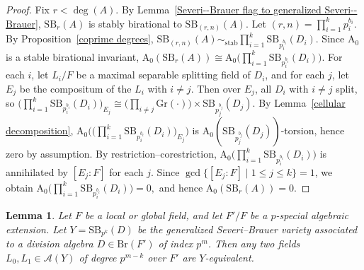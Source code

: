 \documentclass[10pt]{amsart}
\theoremstyle{plain}
\newtheorem{lemma}[thm]{Lemma}
\theoremstyle{definition}
\newcommand{\Br}{\text{Br}}
\begin{document}
\begin{proof}
Fix \(r < \deg(A)\). By Lemma~\ref{Severi--Brauer flag to generalized Severi--Brauer}, \(\mathrm{SB}_r(A)\) is stably birational to \(\mathrm{SB}_{(r,n)}(A)\). Let \((r,n)=\prod_{i=1}^k p_i^{b_i}\). By Proposition~\ref{coprime degrees}, \(\mathrm{SB}_{(r,n)}(A) \sim_{\mathrm{stab}} \prod_{i=1}^k \mathrm{SB}_{p_i^{b_i}}(D_i)\). Since \(\mathrm{A_0}\) is a stable birational invariant, 
\(
\mathrm{A_0}(\mathrm{SB}_r(A)) \cong \mathrm{A_0}\!\big(\prod_{i=1}^k \mathrm{SB}_{p_i^{b_i}}(D_i)\big)\). For each \(i\), let \(L_i/F\) be a maximal separable splitting field of \(D_i\), and for each \(j\), let \(E_j\) be the compositum of the \(L_i\) with \(i\neq j\). Then over \(E_j\), all \(D_i\) with \(i\neq j\) split, so 
\(
\big(\prod_{i=1}^k \mathrm{SB}_{p_i^{b_i}}(D_i)\big)_{E_j}
\cong
\big(\prod_{i\ne j} \mathrm{Gr}(\cdot)\big)\times \mathrm{SB}_{p_j^{b_j}}(D_j).
\)
By Lemma~\ref{cellular decomposition}, 
\(
\mathrm{A_0}\!\big(\big(\prod_{i=1}^k \mathrm{SB}_{p_i^{b_i}}(D_i)\big)_{E_j}\big)
\)
is \(\mathrm{A_0}(\mathrm{SB}_{p_j^{b_j}}(D_j))\)-torsion, hence zero by assumption. By restriction--corestriction, 
\(
\mathrm{A_0}\!\big(\prod_{i=1}^k \mathrm{SB}_{p_i^{b_i}}(D_i)\big)
\)
is annihilated by \([E_j:F]\) for each \(j\). Since \(\gcd\{[E_j:F]\mid 1\le j\le k\}=1\), we obtain 
\(
\mathrm{A_0}\!\big(\prod_{i=1}^k \mathrm{SB}_{p_i^{b_i}}(D_i)\big)=0,
\)
and hence \(\mathrm{A_0}(\mathrm{SB}_r(A))=0\).
\end{proof}

\begin{lemma}\label{p-special connectedness-global}
Let \(F\) be a local or global field, and let \(F'/F\) be a \(p\)-special algebraic extension. Let \(Y = \mathrm{SB}_{p^k}(D)\) be the generalized Severi--Brauer variety associated to a division algebra \(D \in \Br(F')\) of index \(p^m\). Then any two fields \(L_0, L_1 \in \mathcal{A}(Y)\) of degree \(p^{m-k}\) over \(F'\) are \(Y\)-equivalent.
\end{lemma}
\end{document}
